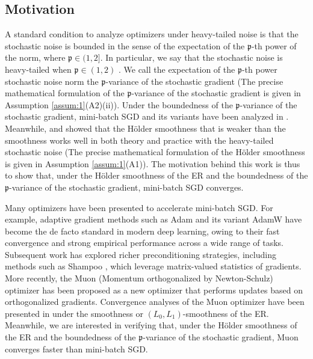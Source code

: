 \documentclass[twoside,11pt]{article}
\begin{document}
\subsection{Motivation}
A standard condition \citep[Assumption 1]{DBLP:conf/nips/ZhangKVKRKS20} to analyze optimizers under heavy-tailed noise is that the stochastic noise is bounded in the sense of the expectation of the $\mathfrak{p}$-th power of the norm, where $\mathfrak{p} \in (1,2]$. In particular, we say that the stochastic noise is heavy-tailed when $\mathfrak{p} \in (1,2)$ \citep[Assumption 1]{DBLP:conf/nips/ZhangKVKRKS20}. We call the expectation of the $\mathfrak{p}$-th power stochastic noise norm the $\mathfrak{p}$-variance of the stochastic gradient (The precise mathematical formulation of the $\mathfrak{p}$-variance of the stochastic gradient is given in Assumption \ref{assum:1}(A2)(ii)). Under the boundedness of the $\mathfrak{p}$-variance of the stochastic gradient, mini-batch SGD and its variants have been analyzed in \citep{DBLP:conf/nips/ZhangKVKRKS20,DBLP:conf/nips/CutkoskyM21,nguyen2023improved,pmlr-v202-sadiev23a,pmlr-v235-liu24bo}. Meanwhile, \cite{fatkhullin2025can} and \cite{yamada_2026} showed that the H\"{o}lder smoothness \citep{Hoelder1882} that is weaker than the smoothness works well in both theory and practice with the heavy-tailed stochastic noise (The precise mathematical formulation of the H\"{o}lder smoothness is given in Assumption \ref{assum:1}(A1)). The motivation behind this work is thus to show that, under the H\"{o}lder smoothness of the ER and the boundedness of the $\mathfrak{p}$-variance of the stochastic gradient, mini-batch SGD converges.

Many optimizers have been presented to accelerate mini-batch SGD. For example, adaptive gradient methods such as Adam \citep{adam} and its variant AdamW \citep{loshchilov2018decoupled} have become the de facto standard in modern deep learning, owing to their fast convergence and strong empirical performance across a wide range of tasks. Subsequent work has explored richer preconditioning strategies, including methods such as Shampoo \citep{pmlr-v80-gupta18a}, which leverage matrix-valued statistics of gradients. More recently, the Muon (Momentum orthogonalized by Newton-Schulz) optimizer \citep{jordan2024muon} has been proposed as a new optimizer that performs updates based on orthogonalized gradients. Convergence analyses of the Muon optimizer have been presented in \citep{tang2026a,sato2025convergenceboundcriticalbatch,pethick2025training,pethick2025generalized,nagashima2026improvedconvergenceratesmuon} under the smoothness or $(L_0, L_1)$-smoothness of the ER. Meanwhile, we are interested in verifying that, under the H\"{o}lder smoothness of the ER and the boundedness of the $\mathfrak{p}$-variance of the stochastic gradient, Muon converges faster than mini-batch SGD. 
\end{document}
